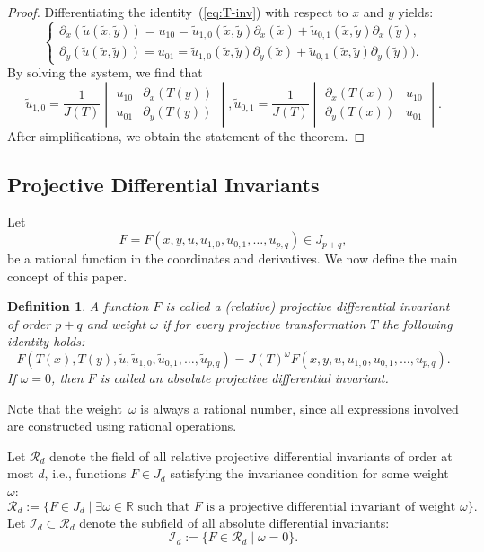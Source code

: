 \documentclass[12pt,reqno]{amsart}
\newtheorem*{definition}{Definition}
\begin{document}
\begin{proof}
Differentiating the identity~(\ref{eq:T-inv}) with respect to $x$ and $y$ yields:
$$
\begin{cases}
\partial_x(\tilde u(\tilde x, \tilde y ))=u_{10}=\tilde u_{1,0}(\tilde x, \tilde y ) \partial_x(\tilde x)+\tilde u_{0,1}(\tilde x, \tilde y ) \partial_x(\tilde y),\\
\partial_y(\tilde u(\tilde x, \tilde y ))=u_{01}=\tilde u_{1,0}(\tilde x, \tilde y ) \partial_y(\tilde x )+\tilde u_{0,1}(\tilde x, \tilde y )  \partial_y(\tilde y)).
\end{cases}
$$
By solving the system, we find that 
$$
\tilde u_{1,0}=\frac{1}{J(T)}\begin{vmatrix} u_{10} &  \partial_x(T(y)) \\ u_{01} & \partial_y(T(y))\end{vmatrix}, \tilde u_{0,1}=\frac{1}{J(T)}\begin{vmatrix} \partial_x(T(x)) &  u_{10} \\ \partial_y(T(x)) & u_{01}\end{vmatrix}.
$$
After simplifications, we  obtain  the statement of the theorem.
\end{proof}

\subsection{Projective Differential Invariants}
Let
\[
F = F(x, y, u, u_{1,0}, u_{0,1}, \dots, u_{p,q} ) \in J_{p+q},
\]
be a rational function in the coordinates and derivatives. We now define the main concept of this paper.

\begin{definition}
A function $F$ is called a {(relative) projective differential invariant} of order $p+q$ and weight $\omega$ if for every projective  transformation $T $ the following identity holds:
\[
F(T(x), T(y), \tilde u, \tilde u_{1,0}, \tilde u_{0,1}, \dots, \tilde u_{p,q}) = J(T)^\omega F(x, y, u, u_{1,0}, u_{0,1}, \dots, u_{p,q}).
\]
If $\omega = 0$, then $F$ is called an \textit{absolute projective differential invariant}.
\end{definition}

Note that the weight~$\omega$ is always a rational number, since all expressions involved are constructed using rational operations.



Let $\mathcal{R}_d$ denote the field of all relative projective differential invariants of order at most $d$, i.e., functions $F \in J_d$ satisfying the invariance condition for some weight $\omega$:
\[
\mathcal{R}_d := \{ F \in J_d \mid \exists \omega \in \mathbb{R} \text{ such that } F \text{ is a projective differential invariant of weight } \omega \}.
\]
Let $\mathcal{I}_d \subset \mathcal{R}_d$ denote the subfield of all absolute differential invariants:
\[
\mathcal{I}_d := \{ F \in \mathcal{R}_d \mid \omega = 0 \}.
\]
\end{document}
